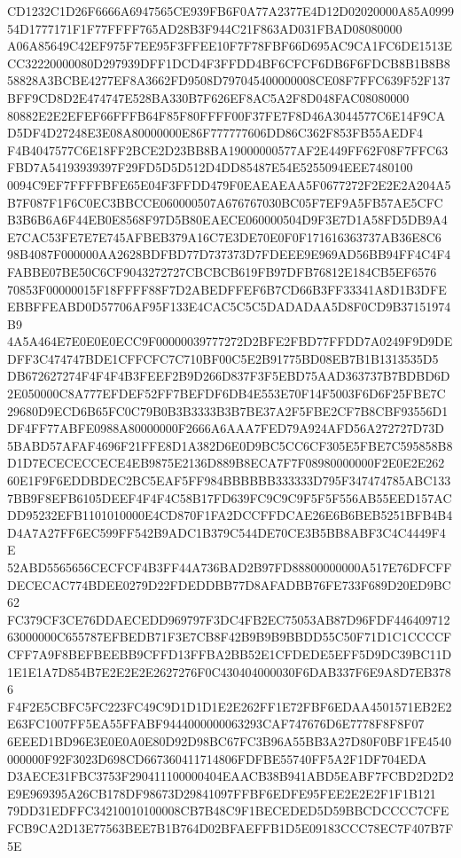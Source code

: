 \documentclass[UTF8,fontset=fandol,zihao=-4,a4paper]{ctexart}
\begin{document}
{{CD1232C1D26F6666A6947565CE939FB6F0A77A2377E4D12D02020000A85A099954D1777171F1F77FFFF765AD28B3F944C21F863AD031FBAD08080000
A06A85649C42EF975F7EE95F3FFEE10F7F78FBF66D695AC9CA1FC6DE1513ECC32220000080D297939DFF1DCD4F3FFDD4BF6CFCF6DB6F6FDCB8B1B8B8
58828A3BCBE4277EF8A3662FD9508D797045400000008CE08F7FFC639F52F137BFF9CD8D2E474747E528BA330B7F626EF8AC5A2F8D048FAC08080000
80882E2E2EFEF66FFFB64F85F80FFFF00F37FE7F8D46A3044577C6E14F9CAD5DF4D27248E3E08A80000000E86F777777606DD86C362F853FB55AEDF4
F4B4047577C6E18FF2BCE2D23BB8BA19000000577AF2E449FF62F08F7FFC63FBD7A54193939397F29FD5D5D512D4DD85487E54E5255094EEE7480100
0094C9EF7FFFFBFE65E04F3FFDD479F0EAEAEAA5F0677272F2E2E2A204A5B7F087F1F6C0EC3BBCCE060000507A676767030BC05F7EF9A5FB57AE5CFC
B3B6B6A6F44EB0E8568F97D5B80EAECE060000504D9F3E7D1A58FD5DB9A4E7CAC53FE7E7E745AFBEB379A16C7E3DE70E0F0F171616363737AB36E8C6
98B4087F000000AA2628BDFBD77D737373D7FDEEE9E969AD56BB94FF4C4F4FABBE07BE50C6CF9043272727CBCBCB619FB97DFB76812E184CB5EF6576
70853F00000015F18FFFF88F7D2ABEDFFEF6B7CD66B3FF33341A8D1B3DFEEBBFFEABD0D57706AF95F133E4CAC5C5C5DADADAA5D8F0CD9B37151974B9
4A5A464E7E0E0E0ECC9F00000039777272D2BFE2FBD77FFDD7A0249F9D9DEDFF3C474747BDE1CFFCFC7C710BF00C5E2B91775BD08EB7B1B1313535D5
DB672627274F4F4F4B3FEEF2B9D266D837F3F5EBD75AAD363737B7BDBD6D2E050000C8A777EFDEF52FF7BEFDF6DB4E553E70F14F5003F6D6F25FBE7C
29680D9ECD6B65FC0C79B0B3B3333B3B7BE37A2F5FBE2CF7B8CBF93556D1DF4FF77ABFE0988A80000000F2666A6AAA7FED79A924AFD56A272727D73D
5BABD57AFAF4696F21FFE8D1A382D6E0D9BC5CC6CF305E5FBE7C595858B8D1D7ECECECCECE4EB9875E2136D889B8ECA7F7F08980000000F2E0E2E262
60E1F9F6EDDBDEC2BC5EAF5FF984BBBBBB333333D795F347474785ABC1337BB9F8EFB6105DEEF4F4F4C58B17FD639FC9C9C9F5F5F556AB55EED157AC
DD95232EFB1101010000E4CD870F1FA2DCCFFDCAE26E6B6BEB5251BFB4B4D4A7A27FF6EC599FF542B9ADC1B379C544DE70CE3B5BB8ABF3C4C4449F4E
52ABD5565656CECFCF4B3FF44A736BAD2B97FD88800000000A517E76DFCFFDECECAC774BDEE0279D22FDEDDBB77D8AFADBB76FE733F689D20ED9BC62
FC379CF3CE76DDAECEDD969797F3DC4FB2EC75053AB87D96FDF44640971263000000C655787EFBEDB71F3E7CB8F42B9B9B9BBDD55C50F71D1C1CCCCF
CFF7A9F8BEFBEEBB9CFFD13FFBA2BB52E1CFDEDE5EFF5D9DC39BC11D1E1E1A7D854B7E2E2E2E2627276F0C430404000030F6DAB337F6E9A8D7EB3786
F4F2E5CBFC5FC223FC49C9D1D1D1E2E262FF1E72FBF6EDAA4501571EB2E2E63FC1007FF5EA55FFABF9444000000063293CAF747676D6E7778F8F8F07
6EEED1BD96E3E0E0A0E80D92D98BC67FC3B96A55BB3A27D80F0BF1FE4540000000F92F3023D698CD667360411714806FDFBE55740FF5A2F1DF704EDA
D3AECE31FBC3753F290411100000404EAACB38B941ABD5EABF7FCBD2D2D2E9E969395A26CB178DF98673D29841097FFBF6EDFE95FEE2E2E2F1F1B121
79DD31EDFFC34210010100008CB7B48C9F1BECEDED5D59BBCDCCCC7CFEFCB9CA2D13E77563BEE7B1B764D02BFAEFFB1D5E09183CCC78EC7F407B7F5E
}}
\end{document}
